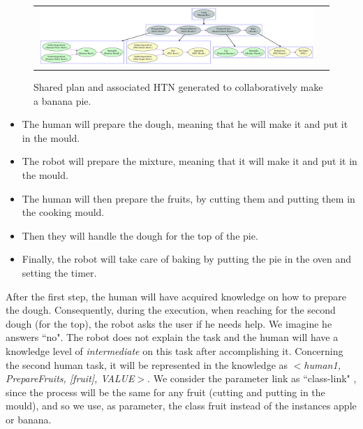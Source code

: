 \begin{figure}[ht!]
 \centering
 \begin{tabular}{cc}
  \includegraphics[width=0.99\textwidth]{img/plan_management/bananaPie.pdf}
 \end{tabular}
   \vspace{-8pt}
 \caption{Shared plan and associated HTN generated to collaboratively make a banana pie.}
 \label{fig:plan_management-bananaPlan}
   \vspace{-22pt}
 \end{figure}
 

\begin{itemize}
\item The human will prepare the dough, meaning that he will make it and put it in the mould.
\item The robot will prepare the mixture, meaning that it will make it and put it in the mould.
\item The human will then prepare the fruits, by cutting them and putting them in the cooking mould.
\item Then they will handle the dough for the top of the pie.
\item Finally, the robot will take care of baking by putting the pie in the oven and setting the timer.
\end{itemize} 

After the first step, the human will have acquired knowledge on how to prepare the dough.
Consequently, during the execution, when reaching for the second dough (for the top), the robot asks the user if he needs help. We imagine he answers ``no". The robot does not explain the task  and the human will have a knowledge level of  \textit{intermediate} on this task after accomplishing it. Concerning the second human task, it will be represented in the knowledge as \textit{$<$human1, PrepareFruits, [fruit], VALUE$>$}. We consider the parameter link as ``class-link" , since the process will be the same for any fruit (cutting and putting in the mould), and so we use, as parameter, the class fruit instead of the instances apple or banana.

